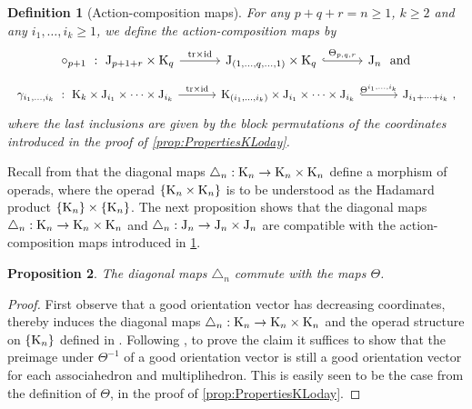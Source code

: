 \documentclass[10pt]{amsart}
\newtheorem{definition}{Definition}[section]
\newtheorem{proposition}[definition]{Proposition}
\theoremstyle{remark}
\begin{document}
\begin{definition}[Action-composition maps] \label{def:action-composition}
For any $p+q+r=n\geq 1$, $k\geq 2$ and any $i_1,\ldots,i_k \geq 1$, we define the \emph{action-composition maps} by 
\[
\vcenter{\hbox{
\begin{tikzcd}[column sep = 16pt]
\circ_{p+1}\ : \ \J_{p+1+r}\times \K_q
\arrow[rr,  "\tr\times \id"]
& & 
\J_{(1,\ldots,q,\ldots,1)}\times \K_q 
\arrow[rr,hookrightarrow, "\Theta_{p,q,r}"]
&  &
\J_{n}\ \ \text{and}
\end{tikzcd}
}}
\]
\[
\vcenter{\hbox{
\begin{tikzcd}[column sep = 16pt]
\gamma_{i_1,\ldots,i_k}\ : \ \K_{k}\times \J_{i_1} \times \cdots \times \J_{i_k}
\arrow[rr,  "\tr\times \id"]
& &
\K_{(i_1,\ldots,i_k)} \times \J_{i_1} \times \cdots \times \J_{i_k} 
\arrow[rr,hookrightarrow, "\Theta^{i_1, \ldots , i_k}"]
& &
\J_{i_1+\cdots + i_k}\ , 
\end{tikzcd}
}}
\]
where the last inclusions are given by the block permutations of the coordinates introduced in the proof of \cref{prop:PropertiesKLoday}. 
\end{definition}

Recall from \cite[Theorem 1]{MTTV19} that the diagonal maps $\triangle_n : \mathrm{K}_n \to \mathrm{K}_n \times \mathrm{K}_n$ define a morphism of operads, where the operad $\{ \mathrm{K}_n \times \mathrm{K}_n \}$ is to be understood as the Hadamard product $\{ \mathrm{K}_n \} \times \{ \mathrm{K}_n \}$.
The next proposition shows that the diagonal maps $\triangle_n : \mathrm{K}_n \to \mathrm{K}_n \times \mathrm{K}_n$ and $\triangle_n : \mathrm{J}_n \to \mathrm{J}_n \times \mathrm{J}_n$ are compatible with the action-composition maps introduced in \cref{def:action-composition}.

\begin{proposition} 
\label{prop:thetacommutes}
The diagonal maps $\triangle_n$ commute with the maps $\Theta$.  
\end{proposition}

\begin{proof}
First observe that a good orientation vector has decreasing coordinates, thereby induces the diagonal maps $\triangle_n : \mathrm{K}_n \to \mathrm{K}_n \times \mathrm{K}_n$ and the operad structure on $\{\mathrm{K}_n\}$ defined in \cite{MTTV19}. 
Following \cite[Proposition 4.14]{LA21}, to prove the claim it suffices to show that the preimage under $\Theta^{-1}$ of a good orientation vector is still a good orientation vector for each associahedron and multiplihedron. 
This is easily seen to be the case from the definition of $\Theta$, in the proof of \cref{prop:PropertiesKLoday}. 
\end{proof}
\end{document}
